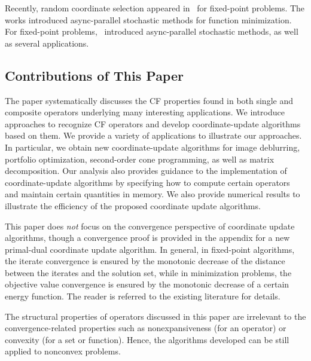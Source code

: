 Recently, random coordinate selection appeared in~\cite{Patrick_2015} for fixed-point problems. The works \cite{nedic2001distributed,recht2011hogwild,liu2013asynchronous,liu2014asynchronous,hsieh2015passcode} introduced async-parallel stochastic methods for function minimization.
For fixed-point problems,~\cite{Peng_2015_AROCK} introduced  async-parallel stochastic methods, as well as several applications.

\subsection{Contributions of This Paper}
The paper systematically discusses the CF properties found in both single and composite operators underlying many interesting applications. We introduce approaches to recognize CF operators and develop coordinate-update algorithms based on them.
We provide a variety of applications to illustrate our approaches.
In particular, we obtain new coordinate-update algorithms for image deblurring, portfolio optimization, second-order cone programming, as well as matrix decomposition. Our analysis also provides guidance to the implementation of coordinate-update algorithms by specifying how to compute certain operators and maintain certain quantities in memory. We also provide numerical results to illustrate the efficiency of the proposed coordinate update algorithms.

This paper does \emph{not} focus on the convergence perspective of coordinate update algorithms, though a convergence proof is provided in the appendix for a new primal-dual coordinate update algorithm. In general, in fixed-point algorithms, the iterate convergence is ensured by the monotonic decrease of the distance between the iterates and the solution set, while in minimization problems, the objective value convergence is ensured by the monotonic decrease of a certain energy function. The reader is referred to the existing literature for details.


The structural properties of operators discussed in this paper are irrelevant to  the convergence-related properties such as nonexpansiveness (for an operator) or convexity (for a set or function). Hence, the algorithms developed can be still applied to nonconvex problems.


